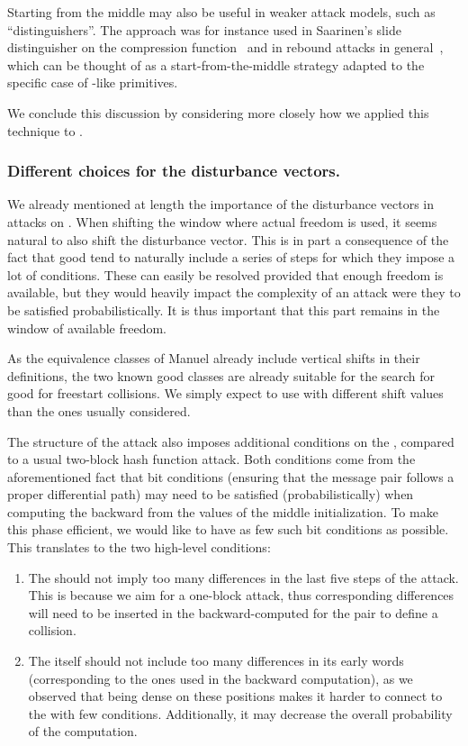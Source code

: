 Starting from the middle may also be useful in weaker attack models, such as ``distinguishers''. The approach was for instance used in
Saarinen's slide distinguisher on the \shaone compression function~\cite{DBLP:conf/fse/Saarinen03} and in
rebound attacks in general~\cite{DBLP:conf/fse/MendelRST09}, which can be thought of as a start-from-the-middle strategy adapted to the specific case of \aes-like primitives.

We conclude this discussion by considering more closely how we applied this technique to \shaone.

\subsubsection{Different choices for the disturbance vectors.}
We already mentioned at length the importance of the disturbance vectors in attacks on \shaone.
When shifting the window where actual freedom is used, it seems natural to also shift the disturbance vector.
This is in part a consequence of the fact that good \dvs tend to naturally include a series of steps for which they impose a lot of conditions. These can easily be resolved provided that
enough freedom is available, but they would heavily impact the complexity of an attack were they to be satisfied probabilistically. It is thus important that this part remains
in the window of available freedom.

As the equivalence classes of Manuel already include vertical shifts in their definitions, the two known good classes are already suitable for the search for good \dvs for freestart collisions.
We simply expect to use \dvs with different shift values than the ones usually considered.

\medskip

The structure of the attack also imposes additional conditions on the \dv, compared to a usual two-block hash function attack. Both conditions come from the aforementioned fact that bit conditions
(ensuring that the message pair follows a proper differential path)
may need to be satisfied (probabilistically) when computing the \iv backward from the values of the middle initialization. To make this phase efficient, we would like to have as few such
bit conditions as possible. This translates to the two high-level conditions:
\begin{enumerate}
\item The \dv should not imply too many differences in the last five steps of the attack. This is because we aim for a one-block attack, thus corresponding differences will need to be inserted in the
backward-computed \iv for the pair to define a collision.
\item The \dv itself should not include too many differences in its early words (corresponding to the ones used in the backward computation), as we observed that being dense on these positions makes
it harder to connect to the \iv with few conditions. Additionally, it may decrease the overall probability of the computation.
\end{enumerate}

